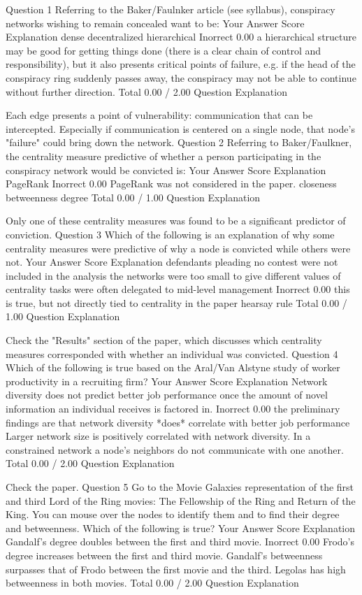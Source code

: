 Question 1
Referring to the Baker/Faulnker article (see syllabus), conspiracy networks wishing to remain concealed want to be:
Your Answer		Score	Explanation
dense			
decentralized			
hierarchical	Inorrect	0.00	a hierarchical structure may be good for getting things done (there is a clear chain of control and responsibility), but it also presents critical points of failure, e.g. if the head of the conspiracy ring suddenly passes away, the conspiracy may not be able to continue without further direction.
Total		0.00 / 2.00	
Question Explanation

Each edge presents a point of vulnerability: communication that can be intercepted. Especially if communication is centered on a single node, that node's "failure" could bring down the network.
Question 2
Referring to Baker/Faulkner, the centrality measure predictive of whether a person participating in the conspiracy network would be convicted is:
Your Answer		Score	Explanation
PageRank	Inorrect	0.00	PageRank was not considered in the paper.
closeness			
betweenness			
degree			
Total		0.00 / 1.00	
Question Explanation

Only one of these centrality measures was found to be a significant predictor of conviction.
Question 3
Which of the following is an explanation of why some centrality measures were predictive of why a node is convicted while others were not.
Your Answer		Score	Explanation
defendants pleading no contest were not included in the analysis			
the networks were too small to give different values of centrality			
tasks were often delegated to mid-level management	Inorrect	0.00	this is true, but not directly tied to centrality in the paper
hearsay rule			
Total		0.00 / 1.00	
Question Explanation

Check the "Results" section of the paper, which discusses which centrality measures corresponded with whether an individual was convicted.
Question 4
Which of the following is true based on the Aral/Van Alstyne study of worker productivity in a recruiting firm?
Your Answer		Score	Explanation
Network diversity does not predict better job performance once the amount of novel information an individual receives is factored in.	Inorrect	0.00	the preliminary findings are that network diversity *does* correlate with better job performance
Larger network size is positively correlated with network diversity.			
In a constrained network a node's neighbors do not communicate with one another.			
Total		0.00 / 2.00	
Question Explanation

Check the paper.
Question 5
Go to the Movie Galaxies representation of the first and third Lord of the Ring movies: The Fellowship of the Ring and Return of the King. You can mouse over the nodes to identify them and to find their degree and betweenness. Which of the following is true?
Your Answer		Score	Explanation
Gandalf's degree doubles between the first and third movie.	Inorrect	0.00	
Frodo's degree increases between the first and third movie.			
Gandalf's betweenness surpasses that of Frodo between the first movie and the third.			
Legolas has high betweenness in both movies.			
Total		0.00 / 2.00	
Question Explanation


